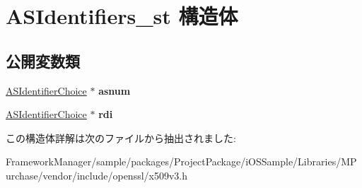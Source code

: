 \hypertarget{struct_a_s_identifiers__st}{}\section{A\+S\+Identifiers\+\_\+st 構造体}
\label{struct_a_s_identifiers__st}
\subsection*{公開変数類}
\begin{DoxyCompactItemize}
\item 
\hypertarget{struct_a_s_identifiers__st_ab8a15616176638de7321c059e45f210d}{}\hyperlink{struct_a_s_identifier_choice__st}{A\+S\+Identifier\+Choice} $\ast$ {\bfseries asnum}\label{struct_a_s_identifiers__st_ab8a15616176638de7321c059e45f210d}

\item 
\hypertarget{struct_a_s_identifiers__st_afa2c22bf2d18e3d2ce749486b455e0c7}{}\hyperlink{struct_a_s_identifier_choice__st}{A\+S\+Identifier\+Choice} $\ast$ {\bfseries rdi}\label{struct_a_s_identifiers__st_afa2c22bf2d18e3d2ce749486b455e0c7}

\end{DoxyCompactItemize}


この構造体詳解は次のファイルから抽出されました\+:\begin{DoxyCompactItemize}
\item 
Framework\+Manager/sample/packages/\+Project\+Package/i\+O\+S\+Sample/\+Libraries/\+M\+Purchase/vendor/include/openssl/x509v3.\+h\end{DoxyCompactItemize}
